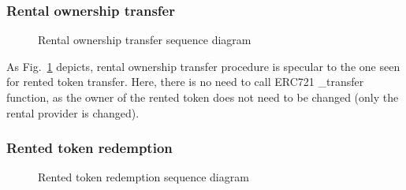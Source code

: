 \documentclass[english, LaM, oneside]{sapthesis}%
\begin{document}
\subsubsection{Rental ownership transfer}

\begin{figure}
    \centering
        \begin{adjustbox}{width=1\textwidth}
        \end{adjustbox}
    \caption{Rental ownership transfer sequence diagram}
    \label{fig:RentalOwnerhipTransfer SD}
\end{figure}

As Fig.~\ref{fig:RentalOwnerhipTransfer SD} depicts, rental ownership transfer procedure is specular to the one seen for rented token transfer. Here, there is no need to call ERC721 \_transfer function, as the owner of the rented token does not need to be changed (only the rental provider is changed).\newline
\bigskip

\subsubsection{Rented token redemption}

\begin{figure}[H]
    \centering
        \begin{adjustbox}{width=1\textwidth}
        \end{adjustbox}
    \caption{Rented token redemption sequence diagram}
    \label{fig:RentedTokenRedemption SD}
\end{figure}
\end{document}
